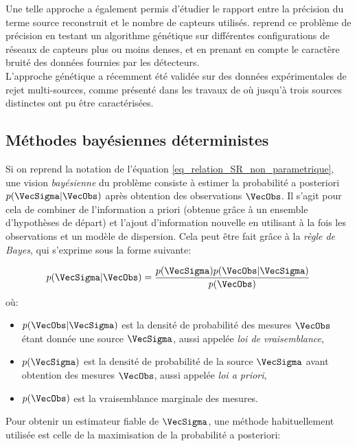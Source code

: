  Une telle approche a également permis d'étudier le rapport entre la précision du terme source reconstruit et le nombre de capteurs utilisés. \cite{Long2010} reprend ce problème de précision en testant un algorithme génétique sur différentes configurations de réseaux de capteurs plus ou moins denses, et en prenant en compte le caractère bruité des données fournies par les détecteurs. \\
 
 L'approche génétique a récemment été validée sur des données expérimentales de rejet multi-sources, comme présenté dans les travaux de \cite{Cantelli2015} où jusqu'à trois sources distinctes ont pu être caractérisées.\\
 
 \subsection{Méthodes bayésiennes déterministes}
 
 Si on reprend la notation de l'équation \eqref{eq_relation_SR_non_parametrique}, une vision \textit{bayésienne} du problème consiste à estimer la probabilité a posteriori $p(\VecSigma | \VecObs)$ après obtention des observations $\VecObs$. Il s'agit pour cela de combiner de l'information a priori (obtenue grâce à un ensemble d'hypothèses de départ) et l'ajout d'information nouvelle en utilisant à la fois les observations et un modèle de dispersion. Cela peut être fait grâce à la \textit{règle de Bayes}, qui s'exprime sous la forme suivante: 
 
 \begin{equation}
	 \label{eq_regle_bayes_deterministe}
	 p(\VecSigma | \VecObs) = \dfrac{p(\VecSigma)p(\VecObs | \VecSigma)}{p(\VecObs)}
 \end{equation}
 où:
 \begin{itemize}
 	\item $p(\VecObs | \VecSigma)$ est la densité de probabilité des mesures $\VecObs$ étant donnée une source $\VecSigma$, aussi appelée \textit{loi de vraisemblance},
 	\item $p(\VecSigma)$ est la densité de probabilité de la source $\VecSigma$ avant obtention des mesures $\VecObs$, aussi appelée \textit{loi a priori},
 	\item $p(\VecObs)$ est la vraisemblance marginale des mesures.\\
 \end{itemize}
 
 Pour obtenir un estimateur fiable de $\VecSigma$, une méthode habituellement utilisée est celle de la maximisation de la probabilité a posteriori: 
 
